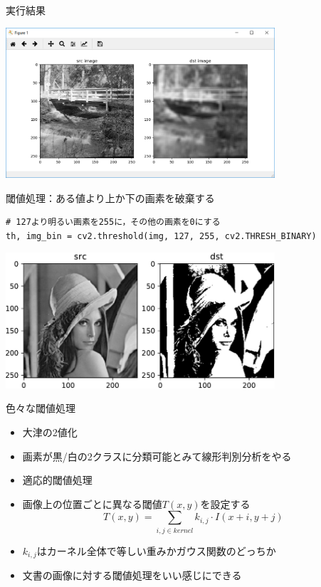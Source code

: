 \documentclass[10pt]{beamer}
\begin{document}
	\begin{frame}{実行結果}
		\begin{center}
			\includegraphics[width=10cm]{./figs/blur.png}
		\end{center}
	\end{frame}
	
	\begin{frame}[fragile]{閾値処理：ある値より上か下の画素を破棄する}
	    \scriptsize
		\begin{verbatim}
# 127より明るい画素を255に，その他の画素を0にする
th, img_bin = cv2.threshold(img, 127, 255, cv2.THRESH_BINARY)
		\end{verbatim}
		\begin{center}
			\includegraphics[width=10cm]{./figs/binary.pdf}
		\end{center}
	\end{frame}
	
	\begin{frame}{色々な閾値処理}
		\begin{itemize}
		    \item 大津の2値化
		        \item 画素が黒/白の2クラスに分類可能とみて線形判別分析をやる
		    \item 適応的閾値処理
		        \item 画像上の位置ごとに異なる閾値$T(x, y)$を設定する
                    \[ T(x, y) = \sum_{i, j \in \mathit{kernel}} k_{i, j} \cdot I(x + i, y + j) \]
                \item $k_{i,j}$はカーネル全体で等しい重みかガウス関数のどっちか
                \item 文書の画像に対する閾値処理をいい感じにできる
		\end{itemize}
	\end{frame}
	
\end{document}
